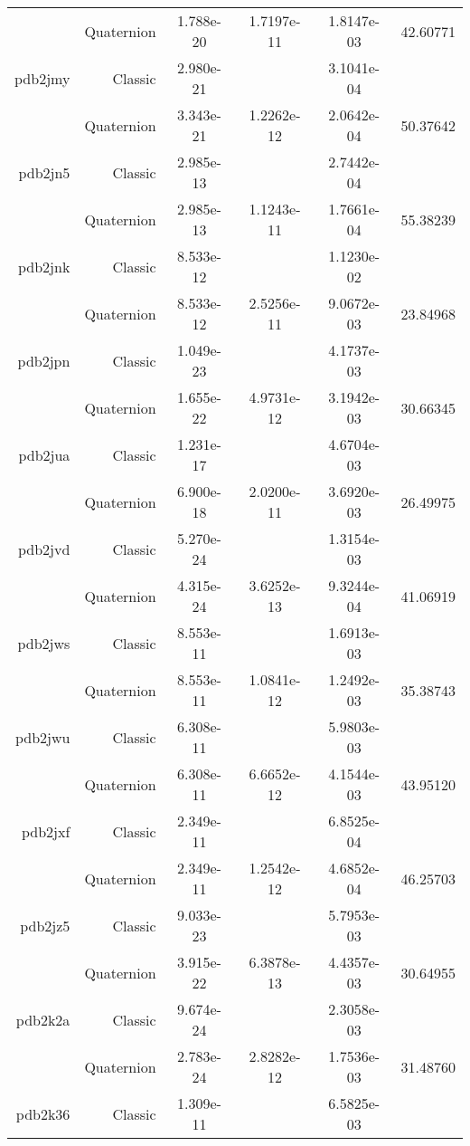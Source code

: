 \begin{xltabular}{\textwidth}{r|rS[table-format=1.3e+2]S[table-format=1.4e+2]S[table-format=1.4e+2]S[table-format=-1.5]}
& Quaternion & 1.788e-20 & 1.7197e-11 & 1.8147e-03 & 42.60771\\  \addlinespace
pdb2jmy & Classic & 2.980e-21 &  & 3.1041e-04 & \\
& Quaternion & 3.343e-21 & 1.2262e-12 & 2.0642e-04 & 50.37642\\  \addlinespace
pdb2jn5 & Classic & 2.985e-13 &  & 2.7442e-04 & \\
& Quaternion & 2.985e-13 & 1.1243e-11 & 1.7661e-04 & 55.38239\\  \addlinespace
pdb2jnk & Classic & 8.533e-12 &  & 1.1230e-02 & \\
& Quaternion & 8.533e-12 & 2.5256e-11 & 9.0672e-03 & 23.84968\\  \addlinespace
pdb2jpn & Classic & 1.049e-23 &  & 4.1737e-03 & \\
& Quaternion & 1.655e-22 & 4.9731e-12 & 3.1942e-03 & 30.66345\\  \addlinespace
pdb2jua & Classic & 1.231e-17 &  & 4.6704e-03 & \\
& Quaternion & 6.900e-18 & 2.0200e-11 & 3.6920e-03 & 26.49975\\  \addlinespace
pdb2jvd & Classic & 5.270e-24 &  & 1.3154e-03 & \\
& Quaternion & 4.315e-24 & 3.6252e-13 & 9.3244e-04 & 41.06919\\  \addlinespace
pdb2jws & Classic & 8.553e-11 &  & 1.6913e-03 & \\
& Quaternion & 8.553e-11 & 1.0841e-12 & 1.2492e-03 & 35.38743\\  \addlinespace
pdb2jwu & Classic & 6.308e-11 &  & 5.9803e-03 & \\
& Quaternion & 6.308e-11 & 6.6652e-12 & 4.1544e-03 & 43.95120\\  \addlinespace
pdb2jxf & Classic & 2.349e-11 &  & 6.8525e-04 & \\
& Quaternion & 2.349e-11 & 1.2542e-12 & 4.6852e-04 & 46.25703\\  \addlinespace
pdb2jz5 & Classic & 9.033e-23 &  & 5.7953e-03 & \\
& Quaternion & 3.915e-22 & 6.3878e-13 & 4.4357e-03 & 30.64955\\  \addlinespace
pdb2k2a & Classic & 9.674e-24 &  & 2.3058e-03 & \\
& Quaternion & 2.783e-24 & 2.8282e-12 & 1.7536e-03 & 31.48760\\  \addlinespace
pdb2k36 & Classic & 1.309e-11 &  & 6.5825e-03 & \\

\end{xltabular}
